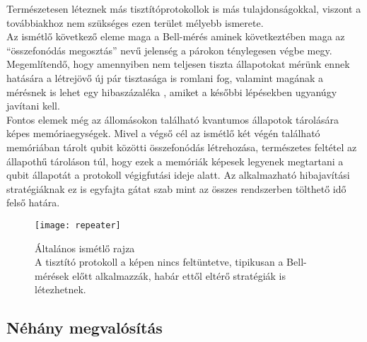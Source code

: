 Természetesen léteznek más tisztítóprotokollok is más tulajdonságokkal, viszont a továbbiakhoz nem szükséges ezen terület mélyebb ismerete.%
\\
Az ismétlő következő eleme maga a Bell-mérés aminek következtében maga az ``összefonódás megosztás'' nevű jelenség a párokon ténylegesen végbe megy. Megemlítendő, hogy amennyiben nem teljesen tiszta állapotokat mérünk ennek hatására a létrejövő új pár tisztasága is romlani fog, valamint magának a mérésnek is lehet egy hibaszázaléka \cite{lutkenhaus1999bell}, amiket a későbbi lépésekben ugyanúgy javítani kell.\\
Fontos elemek még az állomásokon található kvantumos állapotok tárolására képes memóriaegységek. Mivel a végső cél az ismétlő két végén található memóriában tárolt qubit közötti összefonódás létrehozása, természetes feltétel az állapothű tároláson túl, hogy ezek a memóriák képesek legyenek megtartani a qubit állapotát a protokoll végigfutási ideje alatt. Az alkalmazható hibajavítási stratégiáknak ez is egyfajta gátat szab mint az összes rendszerben tölthető idő felső határa. \\
\begin{figure}[h]
\centering
\texttt{[image: repeater]}
\caption[Általános ismétlő]{Általános ismétlő rajza\\ A tisztító protokoll a képen nincs feltüntetve, tipikusan a Bell-mérések előtt alkalmazzák, habár ettől eltérő stratégiák is létezhetnek.}
\end{figure}

\subsection{Néhány megvalósítás}

